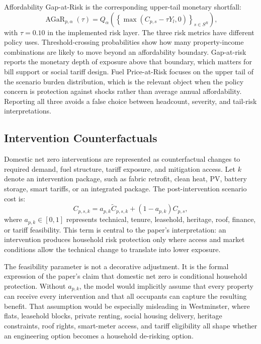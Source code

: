 Affordability Gap-at-Risk is the corresponding upper-tail monetary shortfall:
\begin{equation}
\operatorname{AGaR}_{p,\alpha}(\tau)
=Q_{\alpha}\left(\left\{\max(C_{p,s}-\tau Y_l,0)\right\}_{s\in S^{R}}\right),
\end{equation}
with $\tau=0.10$ in the implemented risk layer. The three risk metrics have different policy uses. Threshold-crossing probabilities show how many property-income combinations are likely to move beyond an affordability boundary. Gap-at-risk reports the monetary depth of exposure above that boundary, which matters for bill support or social tariff design. Fuel Price-at-Risk focuses on the upper tail of the scenario burden distribution, which is the relevant object when the policy concern is protection against shocks rather than average annual affordability. Reporting all three avoids a false choice between headcount, severity, and tail-risk interpretations.

\subsection{Intervention Counterfactuals}

Domestic net zero interventions are represented as counterfactual changes to required demand, fuel structure, tariff exposure, and mitigation access. Let $k$ denote an intervention package, such as fabric retrofit, clean heat, PV, battery storage, smart tariffs, or an integrated package. The post-intervention scenario cost is:
\begin{equation}
C_{p,s,k}=
a_{p,k}\widetilde{C}_{p,s,k}+(1-a_{p,k})C_{p,s},
\end{equation}
where $a_{p,k}\in[0,1]$ represents technical, tenure, leasehold, heritage, roof, finance, or tariff feasibility. This term is central to the paper's interpretation: an intervention produces household risk protection only where access and market conditions allow the technical change to translate into lower exposure.

The feasibility parameter is not a decorative adjustment. It is the formal expression of the paper's claim that domestic net zero is conditional household protection. Without $a_{p,k}$, the model would implicitly assume that every property can receive every intervention and that all occupants can capture the resulting benefit. That assumption would be especially misleading in Westminster, where flats, leasehold blocks, private renting, social housing delivery, heritage constraints, roof rights, smart-meter access, and tariff eligibility all shape whether an engineering option becomes a household de-risking option.


